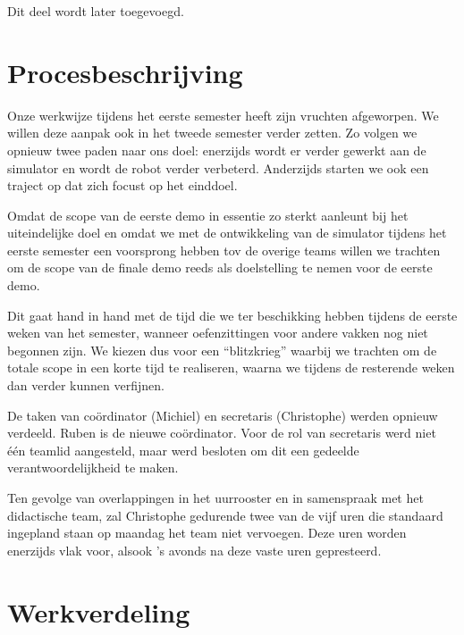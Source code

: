 \documentclass[12pt,a4paper]{report}
\begin{document}
Dit deel wordt later toegevoegd.

\chapter{Procesbeschrijving}

Onze werkwijze tijdens het eerste semester heeft zijn vruchten afgeworpen. We willen deze aanpak ook in het tweede semester verder zetten. Zo volgen we opnieuw twee paden naar ons doel: enerzijds wordt er verder gewerkt aan de simulator en wordt de robot verder verbeterd. Anderzijds starten we ook een traject op dat zich focust op het einddoel.

Omdat de scope van de eerste demo in essentie zo sterkt aanleunt bij het uiteindelijke doel en omdat we met de ontwikkeling van de simulator tijdens het eerste semester een voorsprong hebben tov de overige teams willen we trachten om de scope van de finale demo reeds als doelstelling te nemen voor de eerste demo.

Dit gaat hand in hand met de tijd die we ter beschikking hebben tijdens de eerste weken van het semester, wanneer oefenzittingen voor andere vakken nog niet begonnen zijn. We kiezen dus voor een ``blitzkrieg'' waarbij we trachten om de totale scope in een  korte tijd te realiseren, waarna we tijdens de resterende weken dan verder kunnen verfijnen.

De taken van co\"ordinator (Michiel) en secretaris (Christophe) werden opnieuw verdeeld. Ruben is de nieuwe co\"ordinator. Voor de rol van secretaris werd niet \'e\'en teamlid aangesteld, maar werd besloten om dit een gedeelde verantwoordelijkheid te maken.

Ten gevolge van overlappingen in het uurrooster en in samenspraak met het didactische team, zal Christophe gedurende twee van de vijf uren die standaard ingepland staan op maandag het team niet vervoegen. Deze uren worden enerzijds vlak voor, alsook 's avonds na deze vaste uren gepresteerd.

\chapter{Werkverdeling}
\end{document}
